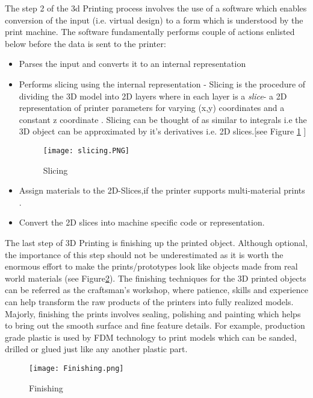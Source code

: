 The step 2 of the 3d Printing process involves the use of a software which enables conversion of the input (i.e. virtual design) to a form which is understood by the print machine. The software fundamentally performs couple of actions enlisted below before the data is sent to the printer:
\begin{itemize}
\item Parses the input and converts it to an internal representation
\item Performs slicing using the internal representation - Slicing is the procedure of dividing the 3D model into 2D layers where in each layer is a \textsl{slice}- a 2D representation of printer parameters for varying (x,y) coordinates and a constant z coordinate . Slicing can be thought of as similar to integrals i.e the 3D object can be approximated by it's derivatives i.e. 2D slices.[see Figure \ref{fig:slicing} \cite{slicing}]
\begin{figure}[ht!]
\centering
\texttt{[image: slicing.PNG]}
\caption{Slicing}
\label{fig:slicing}
\end{figure}

\item Assign materials to the 2D-Slices,if the printer supports multi-material prints . 
\item Convert the 2D slices into machine specific code or representation.
\end{itemize}

The last step of 3D Printing is finishing up the printed object. Although optional, the importance of this step should not be underestimated as it is worth the enormous effort to make the prints/prototypes look like objects made from real world materials (see Figure\ref{fig:Finishing}). The finishing techniques for the 3D printed objects can be referred as the craftsman's workshop, where patience, skills and experience can help transform the raw products of the printers into fully realized models. Majorly, finishing the prints involves sealing, polishing and painting which helps to bring out the smooth surface and fine feature details. For example, production grade plastic is used by FDM technology to print models which can be sanded, drilled or glued just like any another plastic part. 

\begin{figure}[ht!]
\centering
\texttt{[image: Finishing.png]}
\caption{Finishing}
\label{fig:Finishing}
\end{figure}


